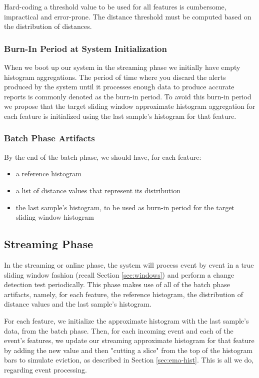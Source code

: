 Hard-coding a threshold value to be used for all features is cumbersome, impractical and error-prone. The distance threshold must be computed based on the distribution of distances.


\subsubsection*{Burn-In Period at System Initialization}
When we boot up our system in the streaming phase we initially have empty histogram aggregations. The period of time where you discard the alerts produced by the system until it processes enough data to produce accurate reports is commonly denoted as the burn-in period. To avoid this burn-in period we propose that the target sliding window approximate histogram aggregation for each feature is initialized using the last sample's histogram for that feature.

\subsubsection*{Batch Phase Artifacts} \label{sec:batch-artifacts-summary}
By the end of the batch phase, we should have, for each feature: 
\begin{itemize}
    \item a reference histogram
    \item a list of distance values that represent its distribution
    \item the last sample's histogram, to be used as burn-in period for the target sliding window histogram
\end{itemize}

\subsection{Streaming Phase} \label{sec:stream-phase}
In the streaming or online phase, the system will process event by event in a true sliding window fashion (recall Section \ref{sec:windows}) and perform a change detection test periodically. This phase makes use of all of the batch phase artifacts, namely, for each feature, the reference histogram, the distribution of distance values and the last sample's histogram.

For each feature, we initialize the approximate histogram with the last sample's data, from the batch phase. Then, for each incoming event and each of the event's features, we update our streaming approximate histogram for that feature by adding the new value and then "cutting a slice" from the top of the histogram bars to simulate eviction, as described in Section \ref{sec:ema-hist}. This is all we do, regarding event processing.

